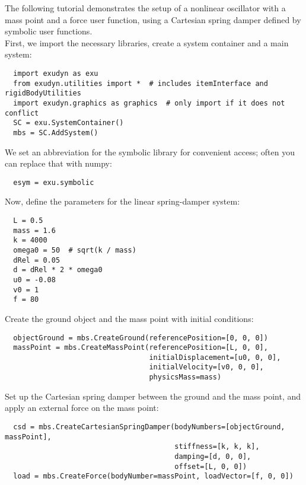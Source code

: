 \clearpage

The following tutorial demonstrates the setup of a nonlinear oscillator with a mass point and a force user function, using a Cartesian spring damper defined by symbolic user functions.
\vspace{6pt}\\
First, we import the necessary libraries, create a system container and a main system:
\pythonstyle\begin{lstlisting}
  import exudyn as exu
  from exudyn.utilities import *  # includes itemInterface and rigidBodyUtilities
  import exudyn.graphics as graphics  # only import if it does not conflict
  SC = exu.SystemContainer()
  mbs = SC.AddSystem()
\end{lstlisting}
%
We set an abbreviation for the symbolic library for convenient access; 
often you can replace that with numpy:
\pythonstyle\begin{lstlisting}
  esym = exu.symbolic
\end{lstlisting}
%
Now, define the parameters for the linear spring-damper system:
\pythonstyle\begin{lstlisting}
  L = 0.5
  mass = 1.6
  k = 4000
  omega0 = 50  # sqrt(k / mass)
  dRel = 0.05
  d = dRel * 2 * omega0
  u0 = -0.08
  v0 = 1
  f = 80
\end{lstlisting}
%
Create the ground object and the mass point with initial conditions:
\pythonstyle\begin{lstlisting}
  objectGround = mbs.CreateGround(referencePosition=[0, 0, 0])
  massPoint = mbs.CreateMassPoint(referencePosition=[L, 0, 0],
                                  initialDisplacement=[u0, 0, 0],
                                  initialVelocity=[v0, 0, 0],
                                  physicsMass=mass)
\end{lstlisting}
%
Set up the Cartesian spring damper between the ground and the mass point, and apply an external force on the mass point:
\pythonstyle\begin{lstlisting}
  csd = mbs.CreateCartesianSpringDamper(bodyNumbers=[objectGround, massPoint],
                                        stiffness=[k, k, k],
                                        damping=[d, 0, 0],
                                        offset=[L, 0, 0])
  load = mbs.CreateForce(bodyNumber=massPoint, loadVector=[f, 0, 0])
\end{lstlisting}

